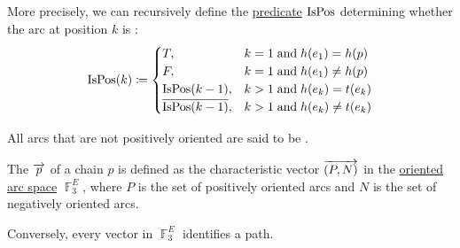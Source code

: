 \begin{definition}
\begin{thmenum}
    More precisely, we can recursively define the \hyperref[def:boolean_function]{predicate} \( \operatorname{IsPos} \) determining whether the arc at position \( k \) is :
    \begin{equation*}
      \begin{aligned}
        \op{IsPos}(k) \coloneqq \begin{cases}
          T,                            &k = 1 \T{and} h(e_1) = h(p) \\
          F,                            &k = 1 \T{and} h(e_1) \neq h(p) \\
          \op{IsPos}(k - 1),            &k > 1 \T{and} h(e_k) = t(e_k) \\
          \overline{\op{IsPos}(k - 1)}, &k > 1 \T{and} h(e_k) \neq t(e_k)
        \end{cases}
      \end{aligned}
    \end{equation*}

    All arcs that are not positively oriented are said to be .

     The  \( \overrightarrow{p} \) of a chain \( p \) is defined as the characteristic vector \( \overrightarrow{(P, N)} \) in the \hyperref[def:multigraph_vector_spaces/oriented_arc]{oriented arc space} \( \BbbF_3^E \), where \( P \) is the set of positively oriented arcs and \( N \) is the set of negatively oriented arcs.

    Conversely, every vector in \( \BbbF_3^E \) identifies a path.
  \end{thmenum}
\end{definition}

